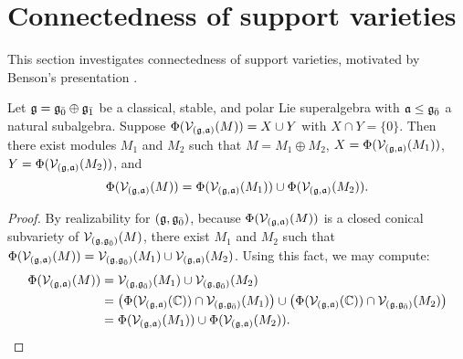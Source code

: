 \section{Connectedness of support varieties}
\label{sec:connectivity}

This section investigates connectedness of support varieties, motivated by Benson's presentation \cite{MR1634407}.

\begin{proposition}
  Let $\g = \even{\g} \oplus \odd{\g}$ be a classical, stable, and polar Lie superalgebra with $\a \leq \even{\g}$ a natural subalgebra. Suppose $\Phi(\V_{(\g,\a)}(M)) = X \cup Y$ with $X \cap Y = \{0\}$. Then there exist modules $M_1$ and $M_2$ such that $M = M_1 \oplus M_2$, $X = \Phi(\V_{(\g,\a)}(M_1))$, $Y = \Phi(\V_{(\g,\a)}(M_2))$, and \[
    \Phi(\V_{(\g,\a)}(M)) = \Phi(\V_{(\g,\a)}(M_1)) \cup \Phi(\V_{(\g,\a)}(M_2)).
  \]
\end{proposition}
\begin{proof}
  By realizability for $(\g,\even{\g})$, because $\Phi(\V_{(\g,\a)}(M))$ is a closed conical subvariety of $\V_{(\g,\even{\g})}(M)$, there exist $M_1$ and $M_2$ such that $\Phi(\V_{(\g,\a)}(M)) = \V_{(\g,\even{\g})}(M_1) \cup \V_{(\g,\a)}(M_2)$. Using this fact, we may compute:
  \begin{align*}
    \Phi(\V_{(\g,\a)}(M)) &= \V_{(\g,\even{\g})}(M_1) \cup \V_{(\g,\even{\g})}(M_2) \\
                         &= \left(\Phi(\V_{(\g,\a)}(\CC)) \cap \V_{(\g,\even{\g})}(M_1)\right) \cup \left(\Phi(\V_{(\g,\a)}(\CC)) \cap \V_{(\g,\even{\g})}(M_2)\right) \\
    &= \Phi(\V_{(\g,\a)}(M_1)) \cup \Phi(\V_{(\g,\a)}(M_2)).
  \end{align*}
\end{proof}




